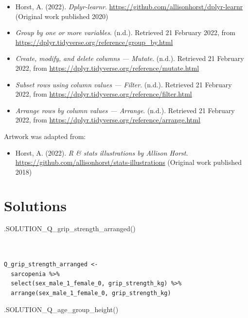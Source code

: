 \documentclass[
  letterpaper,
  DIV=11,
  numbers=noendperiod]{scrreprt}
\newenvironment{Shaded}{\begin{snugshade}}{\end{snugshade}}
\newcommand{\FunctionTok}[1]{\textcolor[rgb]{0.28,0.35,0.67}{#1}}
\newcommand{\NormalTok}[1]{\textcolor[rgb]{0.00,0.23,0.31}{#1}}
\providecommand{\tightlist}{%
  \setlength{\itemsep}{0pt}\setlength{\parskip}{0pt}}\usepackage{longtable,booktabs,array}
\begin{document}
\begin{itemize}
\item
  Horst, A. (2022). \emph{Dplyr-learnr}.
  \url{https://github.com/allisonhorst/dplyr-learnr} (Original work
  published 2020)
\item
  \emph{Group by one or more variables}. (n.d.). Retrieved 21 February
  2022, from \url{https://dplyr.tidyverse.org/reference/group_by.html}
\item
  \emph{Create, modify, and delete columns --- Mutate}. (n.d.).
  Retrieved 21 February 2022, from
  \url{https://dplyr.tidyverse.org/reference/mutate.html}
\item
  \emph{Subset rows using column values --- Filter}. (n.d.). Retrieved
  21 February 2022, from
  \url{https://dplyr.tidyverse.org/reference/filter.html}
\item
  \emph{Arrange rows by column values --- Arrange}. (n.d.). Retrieved 21
  February 2022, from
  \url{https://dplyr.tidyverse.org/reference/arrange.html}
\end{itemize}

Artwork was adapted from:

\begin{itemize}
\tightlist
\item
  Horst, A. (2022). \emph{R \& stats illustrations by Allison Horst}.
  \url{https://github.com/allisonhorst/stats-illustrations} (Original
  work published 2018)
\end{itemize}

\section{Solutions}\label{solutions-6}

\begin{Shaded}
\begin{Highlighting}[]
\FunctionTok{.SOLUTION\_Q\_grip\_strength\_arranged}\NormalTok{()}
\end{Highlighting}
\end{Shaded}

\begin{verbatim}


Q_grip_strength_arranged <- 
  sarcopenia %>%
  select(sex_male_1_female_0, grip_strength_kg) %>%
  arrange(sex_male_1_female_0, grip_strength_kg)
\end{verbatim}

\begin{Shaded}
\begin{Highlighting}[]
\FunctionTok{.SOLUTION\_Q\_age\_group\_height}\NormalTok{()}
\end{Highlighting}
\end{Shaded}
\end{document}
